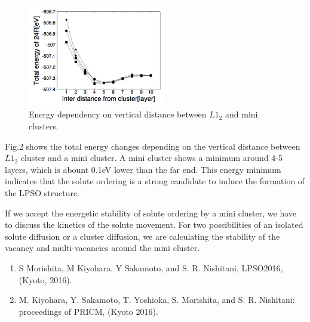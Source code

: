 \documentclass[12pt,a4j]{article}
\begin{document}
\begin{figure}
\vspace{-7\baselineskip}
\begin{center}
\includegraphics[width=6cm,bb=0 0 442 500]{../figs/./calphad_donkey.002.jpeg}
\caption{Energy dependency on vertical distance between $L1_2$ and mini clusters.}
\end{center}
\vspace{0\baselineskip}
\end{figure}
Fig.2 shows the total energy changes depending on the vertical distance between $L1_2$ cluster and a mini cluster.  A mini cluster shows a minimum around 4-5 layers, which is abount 0.1eV lower than the far end.  This energy minimum indicates that the solute ordering is a strong candidate to induce the formation of the LPSO structure.

If we accept the energetic stability of solute ordering by a mini cluster, we have to discuss the kinetics of the solute movement. For two possibilities of an isolated solute diffusion or a cluster diffusion, we are calculating the stability of the vacancy and multi-vacancies around the mini cluster.  
\begin{enumerate}
\item S Morishita, M Kiyohara, Y Sakamoto, and S. R. Nishitani, LPSO2016, (Kyoto, 2016).
\item M. Kiyohara, Y. Sakamoto, T. Yoshioka, S. Morishita, and S. R. Nishitani: proceedings of PRICM, (Kyoto 2016).
\end{enumerate}
\end{document}

